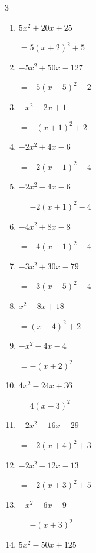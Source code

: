 \begin{multicols}{3}
\begin{enumerate}
        $=5\left( x-3\right)^{2}+3$

  \item $5x^{2}+20x+25$

        $=5\left( x+2\right)^{2}+5$

  \item $-5x^{2}+50x-127$

        $=-5\left( x-5\right)^{2}-2$

  \item $-x^{2}-2x+1$

        $=-\left( x+1\right)^{2}+2$

  \item $-2x^{2}+4x-6$

        $=-2\left( x-1\right)^{2}-4$

\columnbreak %

  \item $-2x^{2}-4x-6$

        $=-2\left( x+1\right)^{2}-4$

  \item $-4x^{2}+8x-8$

        $=-4\left( x-1\right)^{2}-4$

  \item $-3x^{2}+30x-79$

        $=-3\left( x-5\right)^{2}-4$

  \item $x^{2}-8x+18$

        $=\left( x-4\right)^{2}+2$

  \item $-x^{2}-4x-4$

        $=-\left( x+2\right)^{2}$

  \item $4x^{2}-24x+36$

        $=4\left( x-3\right)^{2}$

  \item $-2x^{2}-16x-29$

        $=-2\left( x+4\right)^{2}+3$

  \item $-2x^{2}-12x-13$

        $=-2\left( x+3\right)^{2}+5$

  \item $-x^{2}-6x-9$

        $=-\left( x+3\right)^{2}$

  \item $5x^{2}-50x+125$


\end{enumerate}
\end{multicols}
